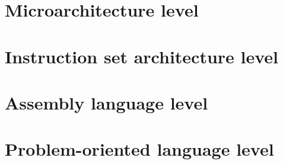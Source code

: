 \documentclass{article}
\begin{document}
\section{Microarchitecture level}

\section{Instruction set architecture level}

\section{Assembly language level}

\section{Problem-oriented language level}
\end{document}
